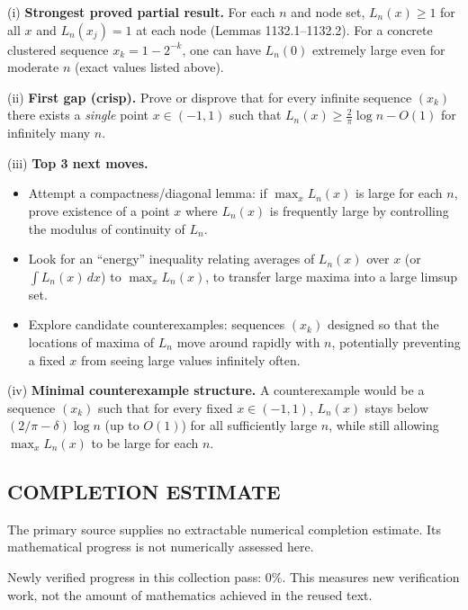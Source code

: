 (i) \textbf{Strongest proved partial result.}
For each $n$ and node set, $L_n(x)\ge 1$ for all $x$ and $L_n(x_j)=1$ at each node (Lemmas 1132.1--1132.2). For a concrete clustered sequence $x_k=1-2^{-k}$, one can have $L_n(0)$ extremely large even for moderate $n$ (exact values listed above).

(ii) \textbf{First gap (crisp).}
Prove or disprove that for every infinite sequence $(x_k)$ there exists a \emph{single} point $x\in(-1,1)$ such that $L_n(x)\ge \tfrac{2}{\pi}\log n - O(1)$ for infinitely many $n$.

(iii) \textbf{Top 3 next moves.}
\begin{itemize}
\item Attempt a compactness/diagonal lemma: if $\max_{x}L_n(x)$ is large for each $n$, prove existence of a point $x$ where $L_n(x)$ is frequently large by controlling the modulus of continuity of $L_n$.
\item Look for an ``energy'' inequality relating averages of $L_n(x)$ over $x$ (or $\int L_n(x)\,dx$) to $\max_x L_n(x)$, to transfer large maxima into a large limsup set.
\item Explore candidate counterexamples: sequences $(x_k)$ designed so that the locations of maxima of $L_n$ move around rapidly with $n$, potentially preventing a fixed $x$ from seeing large values infinitely often.
\end{itemize}

(iv) \textbf{Minimal counterexample structure.}
A counterexample would be a sequence $(x_k)$ such that for every fixed $x\in(-1,1)$, $L_n(x)$ stays below $(2/\pi-\delta)\log n$ (up to $O(1)$) for all sufficiently large $n$, while still allowing $\max_x L_n(x)$ to be large for each $n$.




\subsection*{COMPLETION ESTIMATE}
The primary source supplies no extractable numerical completion estimate. Its mathematical progress is not numerically assessed here.

Newly verified progress in this collection pass: $0\%$. This measures new verification work, not the amount of mathematics achieved in the reused text.
